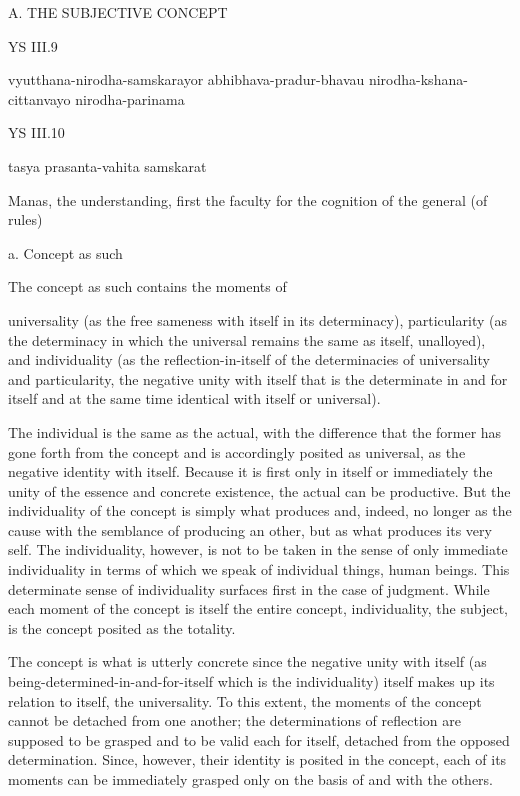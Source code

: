 A. THE SUBJECTIVE CONCEPT

YS III.9

vyutthana-nirodha-samskarayor abhibhava-pradur-bhavau nirodha-kshana-cittanvayo nirodha-parinama

YS III.10

tasya prasanta-vahita samskarat

Manas, the understanding, first the faculty for the cognition of the general (of rules)

a. Concept as such

The concept as such contains the moments of

universality
(as the free sameness with itself in its determinacy),
particularity
(as the determinacy in which the universal remains the same as itself, unalloyed),
and individuality
(as the reflection-in-itself of the determinacies of universality and particularity,
the negative unity with itself that is the determinate in and for itself
and at the same time identical with itself or universal).

    The individual is the same as the actual, with the difference that the
    former has gone forth from the concept and is accordingly posited as
    universal, as the negative identity with itself.
    Because it is first only in itself or immediately the unity of
    the essence and concrete existence, the actual can be productive.
    But the individuality of the concept is simply what produces and, indeed,
    no longer as the cause with the semblance of producing an other,
    but as what produces its very self.
    The individuality, however, is not to be taken in the sense of
    only immediate individuality in terms of which
    we speak of individual things, human beings.
    This determinate sense of individuality surfaces first in the case of judgment.
    While each moment of the concept is itself the entire concept,
    individuality, the subject, is the concept posited as the totality.

The concept is what is utterly concrete since the negative unity with itself
(as being-determined-in-and-for-itself which is the individuality)
itself makes up its relation to itself, the universality.
To this extent, the moments of the concept cannot be detached from one another;
the determinations of reflection are supposed to be grasped
and to be valid each for itself,
detached from the opposed determination.
Since, however, their identity is posited in the concept,
each of its moments can be immediately grasped only
on the basis of and with the others.

